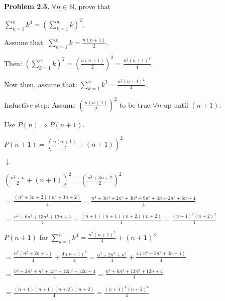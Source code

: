 \documentclass{article}
\begin{document}
\textbf{Problem 2.3.} $\forall n \in \mathbb{N}$, prove that

\begin{center}
	$\displaystyle\sum_{k=1}^{n} k^3 = \left(\displaystyle\sum_{k=1}^{n} k\right)^2$.
\end{center}

Assume that: $\displaystyle\sum_{k=1}^{n} k = \frac{n(n+1)}{2}$.

Then: 	$\left(\displaystyle\sum_{k=1}^{n} k \right)^2 =  \left(\frac{n(n+1)}{2}\right)^2 = \frac{n^2(n+1)^2}{4}$.

Now then, assume that: $\displaystyle\sum_{k=1}^{n} k^3 = \frac{n^2(n+1)^2}{4}$.

Inductive step: Assume $\left(\frac{n(n+1)}{2}\right)^2$ to be true $\forall n$ up until $(n+1)$. 

Use $P(n) \Rightarrow P(n+1)$.

\vspace{0.5cm}

$P(n+1) = \left(\frac{n(n+1)}{2} + (n+1) \right)^2$

\vspace{0.2cm}
\hspace{2cm} $\downarrow$
\vspace{0.2cm}


$\left(\frac{n^2+n}{2} + (n+1)\right)^2 = \left(\frac{n^2+3n+2}{2}\right)^2$

\vspace{0.5cm}

$= \frac{(n^2+3n+2)(n^2+3n+2)}{4} = \frac{n^4+3n^3+2n^2+3n^3+9n^2+6n+2n^2+6n+4}{4}$

\vspace{0.5cm}

$= \frac{n^4+6n^3+13n^2+12n+4}{4} = \frac{(n+1)(n+1)(n+2)(n+2)}{4} = \frac{(n+1)^2(n+2)^2}{4}$

\vspace{1.2cm}

$P(n+1)$ for $\displaystyle\sum_{k=1}^{n} k^3 = \frac{n^2(n+1)^2}{4} + (n+1)^3$

$= \frac{n^2(n^2+2n+1)}{4} + \frac{4(n+1)^3}{4} = \frac{n^4+2n^3+n^2}{4} + \frac{4(n^3+3n^2+3n+1)}{4}$

\vspace{0.3cm}

$= \frac{n^4+2n^3+n^2+4n^3+12n^2+12n+4}{4} = \frac{n^4+6n^3+13n^2+12n+4}{4}$

\vspace{0.3cm}

$= \frac{(n+1)(n+1)(n+2)(n+2)}{4} = \frac{(n+1)^2(n+2)^2}{4}$
\end{document}
